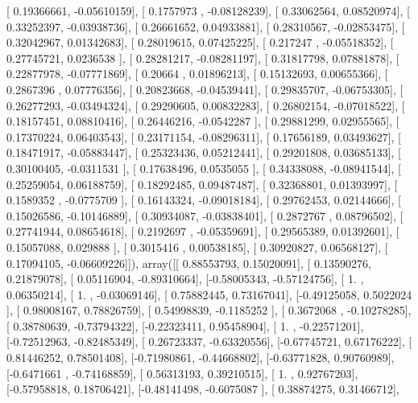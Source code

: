 \documentclass{article}
\begin{document}
       [ 0.19366661, -0.05610159],
       [ 0.1757973 , -0.08128239],
       [ 0.33062564,  0.08520974],
       [ 0.33252397, -0.03938736],
       [ 0.26661652,  0.04933881],
       [ 0.28310567, -0.02853475],
       [ 0.32042967,  0.01342683],
       [ 0.28019615,  0.07425225],
       [ 0.217247  , -0.05518352],
       [ 0.27745721,  0.0236538 ],
       [ 0.28281217, -0.08281197],
       [ 0.31817798,  0.07881878],
       [ 0.22877978, -0.07771869],
       [ 0.20664   ,  0.01896213],
       [ 0.15132693,  0.00655366],
       [ 0.2867396 ,  0.07776356],
       [ 0.20823668, -0.04539441],
       [ 0.29835707, -0.06753305],
       [ 0.26277293, -0.03494324],
       [ 0.29290605,  0.00832283],
       [ 0.26802154, -0.07018522],
       [ 0.18157451,  0.08810416],
       [ 0.26446216, -0.0542287 ],
       [ 0.29881299,  0.02955565],
       [ 0.17370224,  0.06403543],
       [ 0.23171154, -0.08296311],
       [ 0.17656189,  0.03493627],
       [ 0.18471917, -0.05883447],
       [ 0.25323436,  0.05212441],
       [ 0.29201808,  0.03685133],
       [ 0.30100405, -0.0311531 ],
       [ 0.17638496,  0.0535055 ],
       [ 0.34338088, -0.08941544],
       [ 0.25259054,  0.06188759],
       [ 0.18292485,  0.09487487],
       [ 0.32368801,  0.01393997],
       [ 0.1589352 , -0.0775709 ],
       [ 0.16143324, -0.09018184],
       [ 0.29762453,  0.02144666],
       [ 0.15026586, -0.10146889],
       [ 0.30934087, -0.03838401],
       [ 0.2872767 ,  0.08796502],
       [ 0.27741944,  0.08654618],
       [ 0.2192697 , -0.05359691],
       [ 0.29565389,  0.01392601],
       [ 0.15057088,  0.029888  ],
       [ 0.3015416 ,  0.00538185],
       [ 0.30920827,  0.06568127],
       [ 0.17094105, -0.06609226]]), array([[ 0.88553793,  0.15020091],
       [ 0.13590276,  0.21879078],
       [ 0.05116904, -0.89310664],
       [-0.58005343, -0.57124756],
       [ 1.        ,  0.06350214],
       [ 1.        , -0.03069146],
       [ 0.75882445,  0.73167041],
       [-0.49125058,  0.5022024 ],
       [ 0.98008167,  0.78826759],
       [ 0.54998839, -0.1185252 ],
       [ 0.3672068 , -0.10278285],
       [ 0.38780639, -0.73794322],
       [-0.22323411,  0.95458904],
       [ 1.        , -0.22571201],
       [-0.72512963, -0.82485349],
       [ 0.26723337, -0.63320556],
       [-0.67745721,  0.67176222],
       [ 0.81446252,  0.78501408],
       [-0.71980861, -0.44668802],
       [-0.63771828,  0.90760989],
       [-0.6471661 , -0.74168859],
       [ 0.56313193,  0.39210515],
       [ 1.        ,  0.92767203],
       [-0.57958818,  0.18706421],
       [-0.48141498, -0.6075087 ],
       [ 0.38874275,  0.31466712],
\end{document}
